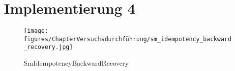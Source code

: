 \section{Implementierung 4}

\begin{figure}[h!]
	\centering
	\texttt{[image: figures/ChapterVersuchsdurchführung/sm\_idempotency\_backward\_recovery.jpg]}
	\caption{SmIdempotencyBackwardRecovery}
\end{figure}
\FloatBarrier